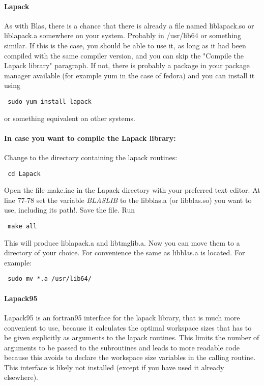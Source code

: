 \documentclass[11p,a4paper]{article}
\begin{document}
\paragraph{Lapack}
As with Blas, there is a chance that there is already a file named liblapack.so or liblapack.a somewhere on your system. Probably in /usr/lib64 or something similar. If this is the case, you should be able to use it, as long as it had been compiled with the same compiler version, and you can skip the "Compile the Lapack library" paragraph. If not, there is probably a package in your package manager available (for example yum in the case of fedora) and you can install it using
\begin{verbatim}
 sudo yum install lapack
\end{verbatim}
or something equivalent on other systems.

\paragraph{In case you want to compile the Lapack library:}
Change to the directory containing the lapack routines:
\begin{verbatim}
 cd Lapack
\end{verbatim}
Open the file make.inc in the Lapack directory with your preferred text editor.
At line 77-78 set the variable \textit{BLASLIB} to the libblas.a (or libblas.so) you want to use, including its path!. Save the file. Run
\begin{verbatim}
 make all
\end{verbatim}
This will produce liblapack.a and libtmglib.a. Now you can move them to a directory of your choice. For convenience the same as libblas.a is located.
For example:
\begin{verbatim}
 sudo mv *.a /usr/lib64/
\end{verbatim}

\paragraph{Lapack95}
Lapack95 is an fortran95 interface for the lapack library, that is much more convenient to use, because it calculates the optimal workspace sizes that has to be given explicitly as arguments to the lapack routines. This limits the number of arguments to be passed to the subroutines and leads to more readable code because this avoids to declare the workspace size variables in the calling routine. This interface is likely not installed (except if you have used it already elsewhere).
\end{document}
